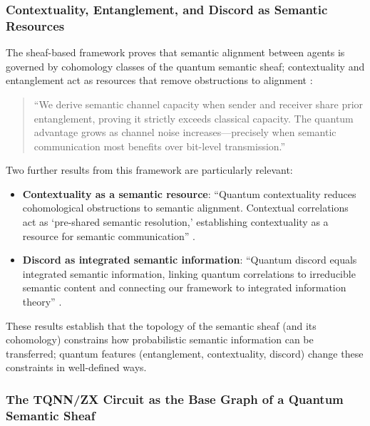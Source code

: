 \documentclass[
]{article}
\providecommand{\tightlist}{%
  \setlength{\itemsep}{0pt}\setlength{\parskip}{0pt}}
\begin{document}
\subsubsection{Contextuality, Entanglement, and Discord as Semantic
Resources}\label{contextuality-entanglement-and-discord-as-semantic-resources}

The sheaf-based framework proves that semantic alignment between agents
is governed by cohomology classes of the quantum semantic sheaf;
contextuality and entanglement act as resources that remove obstructions
to alignment \citep{thomas2025quantum}:

\begin{quote}
``We derive semantic channel capacity when sender and receiver share
prior entanglement, proving it strictly exceeds classical capacity. The
quantum advantage grows as channel noise increases---precisely when
semantic communication most benefits over bit-level transmission.''
\citep{thomas2025quantum}
\end{quote}

Two further results from this framework are particularly relevant:

\begin{itemize}
\tightlist
\item
  \textbf{Contextuality as a semantic resource}: ``Quantum contextuality
  reduces cohomological obstructions to semantic alignment. Contextual
  correlations act as `pre-shared semantic resolution,' establishing
  contextuality as a resource for semantic communication''
  \citep{thomas2025quantum}.
\item
  \textbf{Discord as integrated semantic information}: ``Quantum discord
  equals integrated semantic information, linking quantum correlations
  to irreducible semantic content and connecting our framework to
  integrated information theory'' \citep{thomas2025quantum}.
\end{itemize}

These results establish that the topology of the semantic sheaf (and its
cohomology) constrains how probabilistic semantic information can be
transferred; quantum features (entanglement, contextuality, discord)
change these constraints in well-defined ways.

\subsubsection{The TQNN/ZX Circuit as the Base Graph of a Quantum
Semantic
Sheaf}\label{the-tqnnzx-circuit-as-the-base-graph-of-a-quantum-semantic-sheaf}
\end{document}
